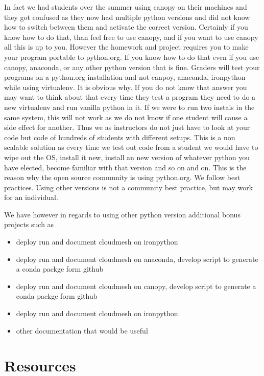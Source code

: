 In fact we had students over the summer using canopy on their machines
and they got confused as they now had multiple python versions and did
not know how to switch between them and activate the correct version.
Certainly if you know how to do that, than feel free to use canopy, and
if you want to use canopy all this is up to you. However the homework
and project requires you to make your program portable to python.org. If
you know how to do that even if you use canopy, anaconda, or any other
python version that is fine. Graders will test your programs on a
python.org installation and not canpoy, anaconda, ironpython while using
virtualenv. It is obvious why. If you do not know that answer you may
want to think about that every time they test a program they need to do
a new virtualenv and run vanilla python in it. If we were to run two
instals in the same system, this will not work as we do not know if one
student will cause a side effect for another. Thus we as instructors do
not just have to look at your code but code of hundreds of students with
different setups. This is a non scalable solution as every time we test
out code from a student we would have to wipe out the OS, install it
new, install an new version of whatever python you have elected, become
familiar with that version and so on and on. This is the reason why the
open source community is using python.org. We follow best practices.
Using other versions is not a community best practice, but may work for
an individual.

We have however in regards to using other python version additional
bonus projects such as

\begin{itemize}
\tightlist
\item
  deploy run and document cloudmesh on ironpython
\item
  deploy run and document cloudmesh on anaconda, develop script to
  generate a conda packge form github
\item
  deploy run and document cloudmesh on canopy, develop script to
  generate a conda packge form github
\item
  deploy run and document cloudmesh on ironpython
\item
  other documentation that would be useful
\end{itemize}


\section{Resources}\label{resources}

